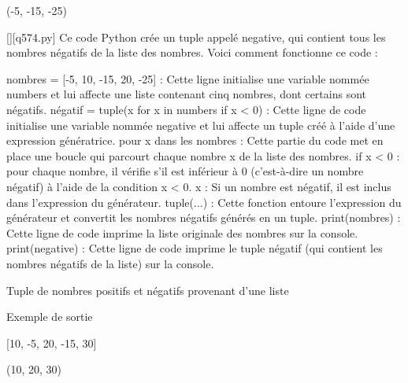 (-5, -15, -25)
        \par
        \begin{solution}
            \renewcommand{\nomfichier}{q574.py}
            \pythonfile{\chemincode \nomfichier}[][\nomfichier]
            Ce code Python crée un tuple appelé negative, qui contient tous les nombres négatifs de la liste des nombres. Voici comment fonctionne ce code :

    nombres = [-5, 10, -15, 20, -25] : Cette ligne initialise une variable nommée numbers et lui affecte une liste contenant cinq nombres, dont certains sont négatifs.
    négatif = tuple(x for x in numbers if x < 0) : Cette ligne de code initialise une variable nommée negative et lui affecte un tuple créé à l'aide d'une expression génératrice.
        pour x dans les nombres : Cette partie du code met en place une boucle qui parcourt chaque nombre x de la liste des nombres.
        if x < 0 : pour chaque nombre, il vérifie s'il est inférieur à 0 (c'est-à-dire un nombre négatif) à l'aide de la condition x < 0.
        x : Si un nombre est négatif, il est inclus dans l'expression du générateur.
        tuple(...) : Cette fonction entoure l'expression du générateur et convertit les nombres négatifs générés en un tuple.
    print(nombres) : Cette ligne de code imprime la liste originale des nombres sur la console.
    print(negative) : Cette ligne de code imprime le tuple négatif (qui contient les nombres négatifs de la liste) sur la console.
        \end{solution}
        

        \question
        Tuple de nombres positifs et négatifs provenant d'une liste

Exemple de sortie

[10, -5, 20, -15, 30]

(10, 20, 30)

